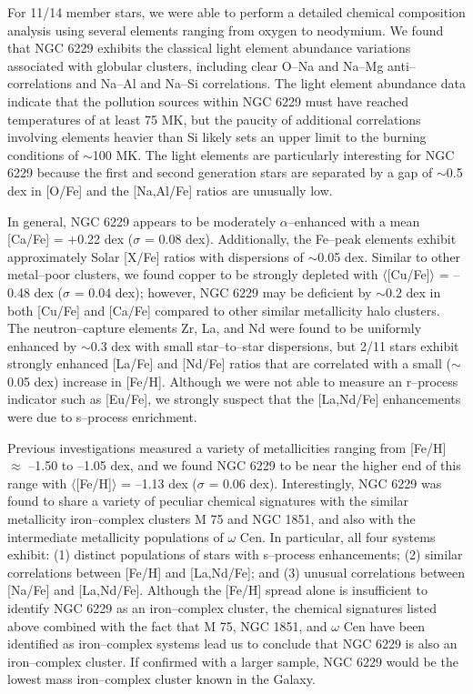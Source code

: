 \documentclass[12pt,preprint]{emulateapj}
\begin{document}
For 11/14 member stars, we were able to perform a detailed chemical composition
analysis using several elements ranging from oxygen to neodymium.  We found
that NGC 6229 exhibits the classical light element abundance variations 
associated with globular clusters, including clear O--Na and Na--Mg 
anti--correlations and Na--Al and Na--Si correlations.  The light element 
abundance data indicate that the pollution sources within NGC 6229 must have 
reached temperatures of at least 75 MK, but the paucity of additional 
correlations involving elements heavier than Si likely sets an upper limit to 
the burning conditions of $\sim$100 MK.  The light elements are 
particularly interesting for NGC 6229 because the first and second generation
stars are separated by a gap of $\sim$0.5 dex in [O/Fe] and the [Na,Al/Fe]
ratios are unusually low.

In general, NGC 6229 appears to be moderately $\alpha$--enhanced with a mean
[Ca/Fe] = $+$0.22 dex ($\sigma$ = 0.08 dex).  Additionally, the Fe--peak 
elements exhibit approximately Solar [X/Fe] ratios with dispersions of 
$\sim$0.05 dex.  Similar to other metal--poor clusters, we found copper to be 
strongly depleted with $\langle$[Cu/Fe]$\rangle$ = --0.48 dex ($\sigma$ = 0.04 
dex); however, NGC 6229 may be deficient by $\sim$0.2 dex in both [Cu/Fe] and 
[Ca/Fe] compared to other similar metallicity halo clusters.  The 
neutron--capture elements Zr, La, and Nd were found to be uniformly enhanced 
by $\sim$0.3 dex with small star--to--star dispersions, but 2/11 stars 
exhibit strongly enhanced [La/Fe] and [Nd/Fe] ratios that are correlated
with a small ($\sim$0.05 dex) increase in [Fe/H].  Although we were not able to 
measure an r--process indicator such as [Eu/Fe], we strongly suspect that the 
[La,Nd/Fe] enhancements were due to s--process enrichment.

Previous investigations measured a variety of metallicities ranging from [Fe/H]
$\approx$ --1.50 to --1.05 dex, and we found NGC 6229 to be near the higher 
end of this range with $\langle$[Fe/H]$\rangle$ = --1.13 dex ($\sigma$ = 0.06 
dex).  Interestingly, NGC 6229 was found to share a variety of peculiar 
chemical signatures with the similar metallicity iron--complex clusters 
M 75 and NGC 1851, and also with the intermediate metallicity populations of
$\omega$ Cen.  In particular, all four systems exhibit: (1) distinct
populations of stars with s--process enhancements; (2) similar 
correlations between [Fe/H] and [La,Nd/Fe]; and (3) unusual correlations
between [Na/Fe] and [La,Nd/Fe].  Although the [Fe/H] spread alone
is insufficient to identify NGC 6229 as an iron--complex cluster, the 
chemical signatures listed above combined with the fact that M 75, NGC 1851, 
and $\omega$ Cen have been identified as iron--complex systems lead us to 
conclude that NGC 6229 is also an iron--complex cluster.  If confirmed with a
larger sample, NGC 6229 would be the lowest mass iron--complex cluster known
in the Galaxy.
\end{document}
